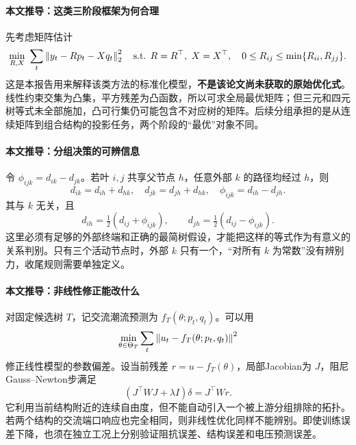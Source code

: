\paragraph{本文推导：这类三阶段框架为何合理}
先考虑矩阵估计
\begin{equation}
 \min_{R,X}\ \sum_t\norm{y_t-Rp_t-Xq_t}_2^2
 \quad\text{s.t. }R=R^\top,\ X=X^\top,\quad
 0\leq R_{ij}\leq\min\{R_{ii},R_{jj}\}.
 \label{eq:s2-illustrative-qp}
\end{equation}
这是本报告用来解释该类方法的标准化模型，\textbf{不是该论文尚未获取的原始优化式}。线性约束交集为凸集，平方残差为凸函数，所以可求全局最优矩阵；但三元和四元树等式未全部施加，凸可行集仍可能包含不对应树的矩阵。后续分组承担的是从连续矩阵到组合结构的投影任务，两个阶段的“最优”对象不同。

\paragraph{本文推导：分组决策的可辨信息}
令 $\phi_{ijk}=d_{ik}-d_{jk}$。若叶 $i,j$ 共享父节点 $h$，任意外部 $k$ 的路径均经过 $h$，则
\begin{equation}
 d_{ik}=d_{ih}+d_{hk},\quad d_{jk}=d_{jh}+d_{hk},
 \quad\phi_{ijk}=d_{ih}-d_{jh}.
\end{equation}
其与 $k$ 无关，且
\begin{equation}
 d_{ih}=\tfrac12(d_{ij}+\phi_{ijk}),\qquad
 d_{jh}=\tfrac12(d_{ij}-\phi_{ijk}).
\end{equation}
这里必须有足够的外部终端和正确的最简树假设，才能把这样的等式作为有意义的关系判别。只有三个活动节点时，外部 $k$ 只有一个，“对所有 $k$ 为常数”没有辨别力，收尾规则需要单独定义。

\paragraph{本文推导：非线性修正能改什么}
对固定候选树 $T$，记交流潮流预测为 $f_T(\theta;p_t,q_t)$。可以用
\begin{equation}
 \min_{\theta\in\Theta_T}\sum_t\left\lVert u_t-f_T(\theta;p_t,q_t)\right\rVert^2
\end{equation}
修正线性模型的参数偏差。设当前残差 $r=u-f_T(\theta)$，局部Jacobian为 $J$，阻尼Gauss--Newton步满足
\begin{equation}
 (J^\top WJ+\lambda I)\delta=J^\top Wr.
\end{equation}
它利用当前结构附近的连续自由度，但不能自动引入一个被上游分组排除的拓扑。若两个结构的交流端口响应也完全相同，则非线性优化同样不能辨别。即使训练误差下降，也须在独立工况上分别验证阻抗误差、结构误差和电压预测误差。

